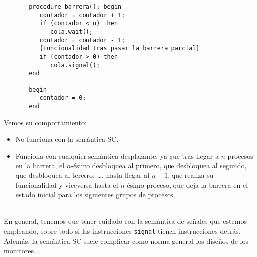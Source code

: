 \begin{ejemplo}
\begin{verbatim}
       procedure barrera(); begin
          contador = contador + 1;
          if (contador < n) then
             cola.wait();
          contador = contador - 1;
          {Funcionalidad tras pasar la barrera parcial}
          if (contador > 0) then
             cola.signal();
       end

       begin
          contador = 0;
       end
\end{verbatim}
Vemos su comportamiento:
\begin{itemize}
    \item No funciona con la semántica SC\@.
    \item Funciona con cualquier semántica desplazante, ya que tras llegar a $n$ procesos en la barrera, el $n$-ésimo desbloquea al primero, que desbloquea al segundo, que desbloquea al tercero, \ldots, hasta llegar al $n-1$, que realiza su funcionalidad y viceversa hasta el $n$-ésimo proceso, que deja la barrera en el estado inicial para los siguientes grupos de procesos.
\end{itemize}
\end{ejemplo}~\\

En general, tenemos que tener cuidado con la semántica de señales que estemos empleando, sobre todo si las instrucciones \verb|signal| tienen instrucciones detrás. Además, la semántica SC suele complicar como norma general los diseños de los monitores.

